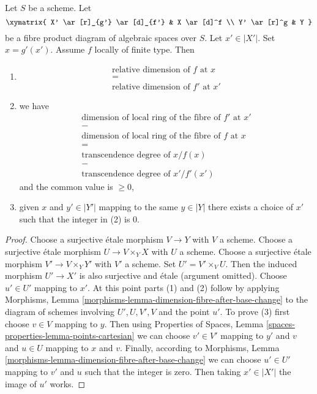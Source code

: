 \begin{lemma}
\label{lemma-dimension-fibre-after-base-change}
Let $S$ be a scheme. Let
$$
\xymatrix{
X' \ar[r]_{g'} \ar[d]_{f'} & X \ar[d]^f \\
Y' \ar[r]^g & Y
}
$$
be a fibre product diagram of algebraic spaces over $S$.
Let $x' \in |X'|$. Set $x = g'(x')$. Assume $f$ locally of finite type.
Then
\begin{enumerate}
\item
$$
\begin{matrix}
\text{relative dimension of }f\text{ at }x \\
= \\
\text{relative dimension of }f'\text{ at }x'
\end{matrix}
$$
\item we have
$$
\begin{matrix}
\text{dimension of local ring of the fibre of }f'\text{ at }x' \\
- \\
\text{dimension of local ring of the fibre of }f\text{ at }x \\
= \\
\text{transcendence degree of }x/f(x) \\
- \\
\text{transcendence degree of }x'/f'(x')
\end{matrix}
$$
and the common value is $\geq 0$,
\item given $x$ and $y' \in |Y'|$ mapping to the same $y \in |Y|$
there exists a choice of $x'$ such that the integer in (2) is $0$.
\end{enumerate}
\end{lemma}

\begin{proof}
Choose a surjective \'etale morphism $V \to Y$ with $V$ a scheme.
Choose a surjective \'etale morphism $U \to V \times_Y X$ with $U$ a scheme.
Choose a surjective \'etale morphism $V' \to V \times_Y Y'$ with $V'$ a scheme.
Set $U' = V' \times_V U$.
Then the induced morphism $U' \to X'$ is also surjective and
\'etale (argument omitted). Choose $u' \in U'$
mapping to $x'$. At this point parts (1) and (2) follow by applying
Morphisms, Lemma \ref{morphisms-lemma-dimension-fibre-after-base-change}
to the diagram of schemes involving $U', U, V', V$ and the point $u'$.
To prove (3) first choose $v \in V$ mapping to $y$.
Then using Properties of Spaces, Lemma
\ref{spaces-properties-lemma-points-cartesian}
we can choose $v' \in V'$ mapping to $y'$ and $v$ and
$u \in U$ mapping to $x$ and $v$. Finally, according to
Morphisms, Lemma \ref{morphisms-lemma-dimension-fibre-after-base-change}
we can choose $u' \in U'$ mapping to $v'$ and $u$ such that
the integer is zero. Then taking $x' \in |X'|$ the image of $u'$ works.
\end{proof}

